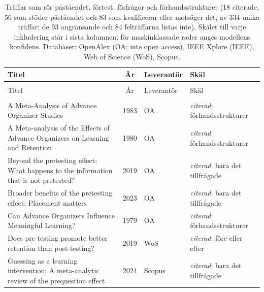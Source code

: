 
\begingroup\footnotesize
\begin{longtable}{@{}%
  >{\raggedright\arraybackslash}p{}c%
  >{\raggedright\arraybackslash}p{}%
  >{\raggedright\arraybackslash}p{}@{}}
\caption{Träffar som rör påståendet, förtest, förfrågor och förhandsstrukturer (18 citerade, 56 som stöder påståendet och 83 som kvalificerar eller motsäger det, av 334 unika träffar; de 93 angränsande och 84 felträffarna listas inte). Skälet till varje inkludering står i sista kolumnen; för maskinklassade rader anges modellens konfidens. Databaser: OpenAlex (OA; inte open access), IEEE Xplore (IEEE), Web of Science (WoS), Scopus.}\label{tab:sok-recap-pretest}\\
\toprule
Titel & År & Leverantör & Skäl \\
\midrule
\endfirsthead
\multicolumn{4}{@{}l}{\emph{\tablename~\thetable{} (forts.)}}\\
\toprule
Titel & År & Leverantör & Skäl \\
\midrule
\endhead
\midrule \multicolumn{4}{r@{}}{\emph{forts.\ på nästa sida}}\\
\endfoot
\bottomrule
\endlastfoot
A Meta-Analysis of Advance Organizer Studies & 1983 & OA & \emph{citerad}: förhandsstrukturer \\
A Meta-analysis of the Effects of Advance Organizers on Learning and Retention & 1980 & OA & \emph{citerad}: förhandsstrukturer \\
Beyond the pretesting effect: What happens to the information that is not pretested? & 2019 & OA & \emph{citerad}: bara det tillfrågade \\
Broader benefits of the pretesting effect: Placement matters & 2023 & OA & \emph{citerad}: bara det tillfrågade \\
Can Advance Organizers Influence Meaningful Learning? & 1979 & OA & \emph{citerad}: förhandsstrukturer \\
Does pre-testing promote better retention than post-testing? & 2019 & WoS & \emph{citerad}: före eller efter \\
Guessing as a learning intervention: A meta-analytic review of the prequestion effect & 2024 & Scopus & \emph{citerad}: bara det tillfrågade \\

\end{longtable}
